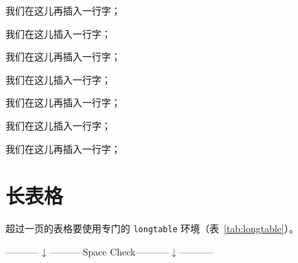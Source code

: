 我们在这儿再插入一行字；

我们在这儿插入一行字；

我们在这儿再插入一行字；

我们在这儿插入一行字；

我们在这儿再插入一行字；

我们在这儿插入一行字；

我们在这儿再插入一行字；

\section{长表格}

超过一页的表格要使用专门的 \texttt{longtable} 环境（表~\ref{tab:longtable}）。\\
\centerline{-----------$\downarrow$-----------Space Check-----------$\downarrow$-----------}



